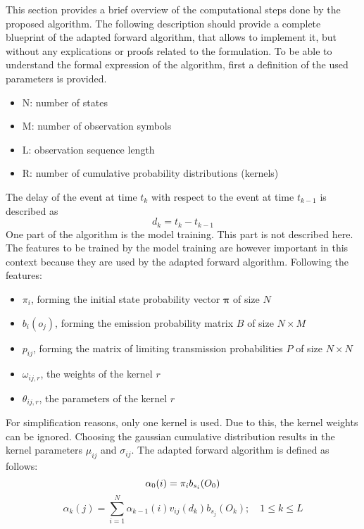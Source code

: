 \documentclass[12pt]{article} %
\begin{document}
This section provides a brief overview of the computational steps done by the
proposed algorithm. The following description should provide a complete
blueprint of the adapted forward algorithm, that allows to implement it, but
without any explications or proofs related to the formulation. To be able to
understand the formal expression of the algorithm, first a definition of the
used parameters is provided.
\begin{itemize}
    \item N: number of states
    \item M: number of observation symbols
    \item L: observation sequence length
    \item R: number of cumulative probability distributions (kernels)
\end{itemize}
The delay of the event at time $ t_k $ with respect to the event at time
$ t_{k-1} $ is described as
\begin{equation}
    d_k = t_k-t_{k-1}
\end{equation}
One part of the algorithm is the model training. This part is not described
here. The features to be trained by the model training are however important
in this context because they are used by the adapted forward algorithm.
Following the features:
\begin{itemize}
    \item $ \pi_i $, forming the initial state probability vector
        $ \boldsymbol{\pi} $ of size $ N $
    \item $ b_i(o_j) $, forming the emission probability matrix $ B $ of size
        $ N \times M $
    \item $ p_{ij} $, forming the matrix of limiting transmission probabilities
        $ P $ of size $ N \times N $
    \item $ \omega_{ij, r} $, the weights of the kernel $ r $
    \item $ \theta_{ij, r} $, the parameters of the kernel $ r $
\end{itemize}
For simplification reasons, only one kernel is used. Due to this, the kernel
weights can be ignored. Choosing the gaussian cumulative distribution results
in the kernel parameters $ \mu_{ij} $ and $ \sigma_{ij} $.  The adapted forward
algorithm is defined as follows:
\begin{equation}
    \alpha_0(i) = \pi_{i}b_{s_i}(O_0) \\
\end{equation}
\begin{equation}
    \alpha_k(j) = \sum_{i=1}^{N} \alpha_{k-1}(i) v_{ij}(d_k) b_{s_j}(O_k);
    \quad 1 \leq k \leq L
\end{equation}
\end{document}
